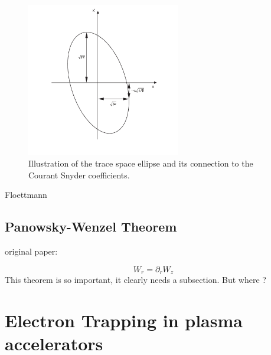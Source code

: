 \begin{figure}

\begin{center}
\includegraphics[width=0.6\textwidth]{theory/images/edited/TraceSpaceCourantSnyder.pdf}
\end{center}
\caption{Illustration of the trace space ellipse and its connection to the Courant Snyder coefficients.}
\label{img:TraceSpace}
\end{figure}
Floettmann 
\subsection{Panowsky-Wenzel Theorem}

original paper:  \cite{Panowsky_Wenzel_original}

 \begin{equation}
W_r =\partial_r W_z
\end{equation} 
This theorem is so important, it clearly needs a subsection. But where ?


\section{Electron Trapping in plasma accelerators}

